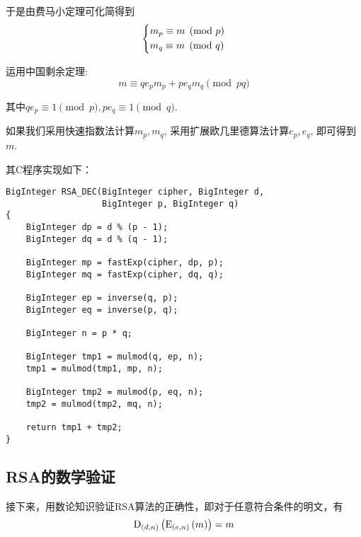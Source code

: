 于是由费马小定理可化简得到
\[\begin{dcases}m_p\equiv m\pmod{p}\\m_q\equiv m\pmod{q}\end{dcases}\]

运用中国剩余定理:
\begin{equation}
m\equiv qe_pm_p+pe_qm_q\pmod{pq}
\end{equation}

其中$qe_p\equiv 1\pmod{p}, pe_q\equiv 1\pmod{q}$.\par
如果我们采用快速指数法计算$m_p, m_q$, 采用扩展欧几里德算法计算$e_p, e_q$, 即可得到$m$.\par
其C程序实现如下：
\begin{prove}
\begin{verbatim}
BigInteger RSA_DEC(BigInteger cipher, BigInteger d,
                   BigInteger p, BigInteger q)
{
    BigInteger dp = d % (p - 1);
    BigInteger dq = d % (q - 1);
    
    BigInteger mp = fastExp(cipher, dp, p);
    BigInteger mq = fastExp(cipher, dq, q);
    
    BigInteger ep = inverse(q, p);
    BigInteger eq = inverse(p, q);
    
    BigInteger n = p * q;
    
    BigInteger tmp1 = mulmod(q, ep, n);
    tmp1 = mulmod(tmp1, mp, n);
    
    BigInteger tmp2 = mulmod(p, eq, n);
    tmp2 = mulmod(tmp2, mq, n);
    
    return tmp1 + tmp2;
}
\end{verbatim}
\end{prove}
\subsection{RSA的数学验证}
接下来，用数论知识验证RSA算法的正确性，即对于任意符合条件的明文，有
\begin{equation}
{\mathrm{D}_{\left( {d, n}\right)}\left({{\mathrm{E}_{\left( {e, n}\right)}\left({m}\right)}}\right)}=m
\end{equation}


